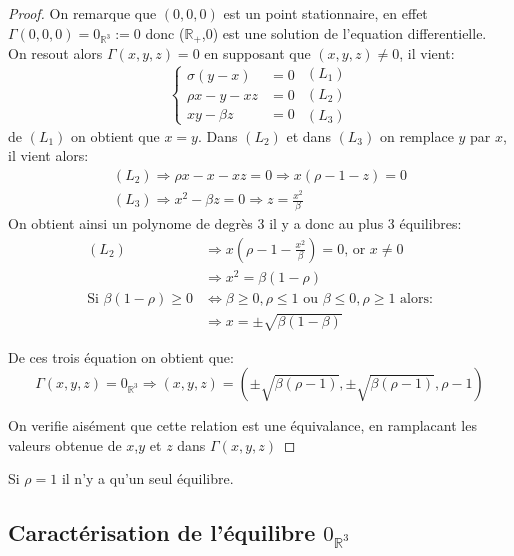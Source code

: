 \documentclass{article}
\newcommand{\R}{\mathbb{R}}
\newtheorem[M]{prop}{Proposition}[section]
\newtheorem[M]{propt}{Propriété}[section]
\newtheorem[L]{thm}{Théoreme}
\newtheorem[L]{cor}{Corollaire}
\begin{document}
\begin{proof}
On remarque que $(0,0,0)$ est un point stationnaire, en effet $\Gamma(0,0,0) = 0_{\R^3}:= 0$ donc ($\R_+$,0) est une solution de l'equation differentielle.\\
On resout alors $\Gamma(x,y,z)=0$ en supposant que $(x,y,z) \neq 0$, il vient:
\[
\left\{\begin{array}{rl} %
     \sigma(y-x)&=0  \\
     \rho x -y -xz&=0\\
     xy - \beta z&=0
\end{array}\right.
\begin{array}{c} %
    (L_1)\\
    (L_2)\\
    (L_3)
\end{array}
\]
de $(L_1)$ on obtient que $x=y$. Dans $(L_2)$ et dans $(L_3)$ on remplace $y$ par $x$, il vient alors:
\begin{gather*}
    (L_2) \Rightarrow \rho x - x - xz = 0 \Rightarrow x (\rho -1 -z ) = 0 \\
    (L_3) \Rightarrow x^2 - \beta z = 0 \Rightarrow z = \frac{x^2}{\beta}
\end{gather*}
On obtient ainsi un polynome de degrès 3 il y a donc au plus 3 équilibres:
\begin{align*}
    (L_2) & \Rightarrow x (\rho - 1 - \frac{x^2}{\beta}) = 0 \text{, or }x \neq 0\\
        & \Rightarrow x^2 = \beta (1-\rho)\\
    \text{Si } \beta(1-\rho) \ge 0 & \Leftrightarrow \beta \ge 0,\rho\le 1 \text{ ou } \beta \le 0,\rho\ge 1\text{ alors:}\\
    &\Rightarrow x = \pm \sqrt{\beta(1-\beta)}
\end{align*}

De ces trois équation on obtient que:
\[
    \Gamma(x,y,z)=0_{\R^3} \Rightarrow (x,y,z) = (\pm \sqrt{ \beta (\rho -1)} ,\pm \sqrt{\beta (\rho -1)}, \rho -1)
\]

On verifie aisément que cette relation est une \'equivalance, en ramplacant les valeurs obtenue de $x$,$y$ et $z$ dans $\Gamma(x,y,z)$
\end{proof}

\begin{example}[Remarque]
    Si $\rho=1$ il n'y a qu'un seul équilibre.
\end{example}

\subsection{Caractérisation de l'équilibre $0_{\R^3}$}
\end{document}
